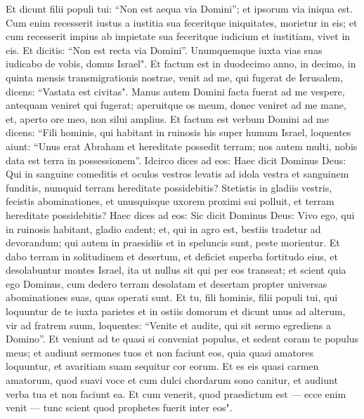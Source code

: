 \begin{biblechapter}
\verse Et dicunt filii populi tui: “Non est aequa via Domini”; et ipsorum via iniqua est. 
\verse Cum enim recesserit iustus a iustitia sua feceritque iniquitates, morietur in eis; 
\verse et cum recesserit impius ab impietate sua feceritque iudicium et iustitiam, vivet in eis. 
\verse Et dicitis: “Non est recta via Domini”. Unumquemque iuxta vias suas iudicabo de vobis, domus Israel". 
\verse Et factum est in duodecimo anno, in decimo, in quinta mensis transmigrationis nostrae, venit ad me, qui fugerat de Ierusalem, dicens: “Vastata est civitas".  
\verse Manus autem Domini facta fuerat ad me vespere, antequam veniret qui fugerat; aperuitque os meum, donec veniret ad me mane, et, aperto ore meo, non silui amplius. 
\verse Et factum est verbum Domini ad me dicens: 
\verse “Fili hominis, qui habitant in ruinosis his super humum Israel, loquentes aiunt: “Unus erat Abraham et hereditate possedit terram; nos autem multi, nobis data est terra in possessionem”. 
\verse Idcirco dices ad eos: Haec dicit Dominus Deus: Qui in sanguine comeditis et oculos vestros levatis ad idola vestra et sanguinem funditis, numquid terram hereditate possidebitis? 
\verse Stetistis in gladiis vestris, fecistis abominationes, et unusquisque uxorem proximi sui polluit, et terram hereditate possidebitis? 
\verse Haec dices ad eos: Sic dicit Dominus Deus: Vivo ego, qui in ruinosis habitant, gladio cadent; et, qui in agro est, bestiis tradetur ad devorandum; qui autem in praesidiis et in speluncis sunt, peste morientur. 
\verse Et dabo terram in solitudinem et desertum, et deficiet superba fortitudo eius, et desolabuntur montes Israel, ita ut nullus sit qui per eos transeat; 
\verse et scient quia ego Dominus, cum dedero terram desolatam et desertam propter universas abominationes suas, quas operati sunt. 
\verse Et tu, fili hominis, filii populi tui, qui loquuntur de te iuxta parietes et in ostiis domorum et dicunt unus ad alterum, vir ad fratrem suum, loquentes: “Venite et audite, qui sit sermo egrediens a Domino”. 
\verse Et veniunt ad te quasi si conveniat populus, et sedent coram te populus meus; et audiunt sermones tuos et non faciunt eos, quia quasi amatores loquuntur, et avaritiam suam sequitur cor eorum. 
\verse Et es eis quasi carmen amatorum, quod suavi voce et cum dulci chordarum sono canitur, et audiunt verba tua et non faciunt ea. 
\verse Et cum venerit, quod praedictum est — ecce enim venit — tunc scient quod prophetes fuerit inter eos". 
\end{biblechapter}

